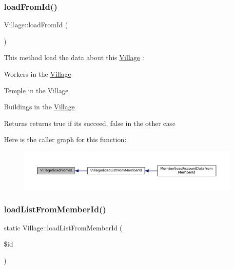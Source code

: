 \subsubsection{\texorpdfstring{load\+From\+Id()}{loadFromId()}}
{\footnotesize\ttfamily Village\+::load\+From\+Id (\begin{DoxyParamCaption}{ }\end{DoxyParamCaption})}



This method load the data about this \mbox{\hyperlink{classVillage}{Village}} \+: 


\begin{DoxyItemize}
\item Workers in the \mbox{\hyperlink{classVillage}{Village}}
\item \mbox{\hyperlink{classTemple}{Temple}} in the \mbox{\hyperlink{classVillage}{Village}}
\item Buildings in the \mbox{\hyperlink{classVillage}{Village}} \begin{DoxyReturn}{Returns}
returns true if it\textquotesingle{}s succeed, false in the other case 
\end{DoxyReturn}

\end{DoxyItemize}Here is the caller graph for this function\+:
\nopagebreak
\begin{figure}[H]
\begin{center}
\leavevmode
\includegraphics[width=350pt]{classVillage_a32709e6efc8c58dcedea9727cfa44973_icgraph}
\end{center}
\end{figure}
\mbox{\label{classVillage_a1cedfa6d0cc4f8c432265c5b8309f931}} 
\subsubsection{\texorpdfstring{load\+List\+From\+Member\+Id()}{loadListFromMemberId()}}
{\footnotesize\ttfamily static Village\+::load\+List\+From\+Member\+Id (\begin{DoxyParamCaption}\item[{}]{\$id }\end{DoxyParamCaption})\hspace{0.3cm}{\ttfamily [static]}}




